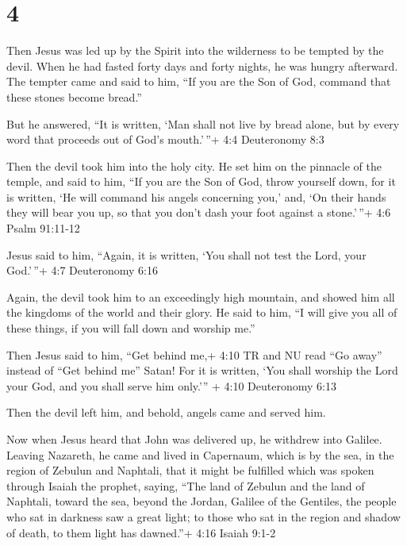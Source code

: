 \hypertarget{section-3}{%
\section{4}\label{section-3}}

 Then Jesus was led up by the Spirit into the wilderness to
be tempted by the devil.  When he had fasted forty days and
forty nights, he was hungry afterward.  The tempter came and
said to him, ``If you are the Son of God, command that these stones
become bread.''

 But he answered, ``It is written, `Man shall not live by
bread alone, but by every word that proceeds out of God's mouth.'\,''+
4:4 Deuteronomy 8:3

 Then the devil took him into the holy city. He set him on
the pinnacle of the temple,  and said to him, ``If you are
the Son of God, throw yourself down, for it is written, `He will command
his angels concerning you,' and, `On their hands they will bear you up,
so that you don't dash your foot against a stone.'\,''+ 4:6 Psalm
91:11-12

 Jesus said to him, ``Again, it is written, `You shall not
test the Lord, your God.'\,''+ 4:7 Deuteronomy 6:16

 Again, the devil took him to an exceedingly high mountain,
and showed him all the kingdoms of the world and their glory.
 He said to him, ``I will give you all of these things, if
you will fall down and worship me.''

 Then Jesus said to him, ``Get behind me,+ 4:10 TR and NU
read ``Go away'' instead of ``Get behind me'' Satan! For it is written,
`You shall worship the Lord your God, and you shall serve him only.''' +
4:10 Deuteronomy 6:13

 Then the devil left him, and behold, angels came and
served him.

 Now when Jesus heard that John was delivered up, he
withdrew into Galilee.  Leaving Nazareth, he came and lived
in Capernaum, which is by the sea, in the region of Zebulun and
Naphtali,  that it might be fulfilled which was spoken
through Isaiah the prophet, saying,  ``The land of Zebulun
and the land of Naphtali, toward the sea, beyond the Jordan, Galilee of
the Gentiles,  the people who sat in darkness saw a great
light; to those who sat in the region and shadow of death, to them light
has dawned.''+ 4:16 Isaiah 9:1-2

